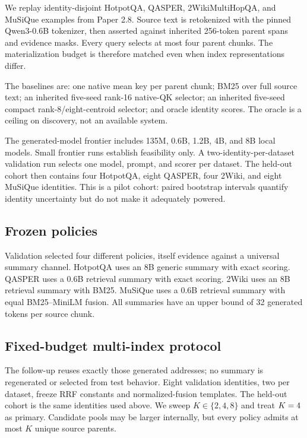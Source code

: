 \documentclass[11pt]{article}
\begin{document}
We replay identity-disjoint HotpotQA, QASPER, 2WikiMultiHopQA, and MuSiQue examples from Paper 2.8. Source text is retokenized with the pinned Qwen3-0.6B tokenizer, then asserted against inherited 256-token parent spans and evidence masks. Every query selects at most four parent chunks. The materialization budget is therefore matched even when index representations differ.

The baselines are: one native mean key per parent chunk; BM25 over full source text; an inherited five-seed rank-16 native-QK selector; an inherited five-seed compact rank-8/eight-centroid selector; and oracle identity scores. The oracle is a ceiling on discovery, not an available system.

The generated-model frontier includes 135M, 0.6B, 1.2B, 4B, and 8B local models. Small frontier runs establish feasibility only. A two-identity-per-dataset validation run selects one model, prompt, and scorer per dataset. The held-out cohort then contains four HotpotQA, eight QASPER, four 2Wiki, and eight MuSiQue identities. This is a pilot cohort: paired bootstrap intervals quantify identity uncertainty but do not make it adequately powered.

\subsection{Frozen policies}

Validation selected four different policies, itself evidence against a universal summary channel. HotpotQA uses an 8B generic summary with exact scoring. QASPER uses a 0.6B retrieval summary with exact scoring. 2Wiki uses an 8B retrieval summary with BM25. MuSiQue uses a 0.6B retrieval summary with equal BM25--MiniLM fusion. All summaries have an upper bound of 32 generated tokens per source chunk.

\subsection{Fixed-budget multi-index protocol}

The follow-up reuses exactly those generated addresses; no summary is regenerated
or selected from test behavior. Eight validation identities, two per dataset,
freeze RRF constants and normalized-fusion templates. The held-out cohort is
the same \PaperThreeOneMultiTestN{} identities used above. We sweep
$K\in\{2,4,8\}$ and treat $K=4$ as primary. Candidate pools
may be larger internally, but every policy admits at most $K$ unique source
parents.
\end{document}

